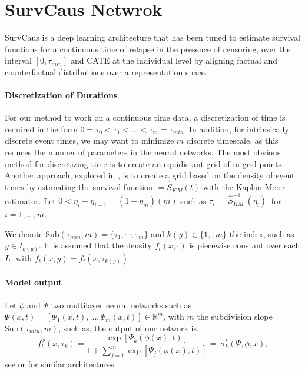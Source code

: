 \documentclass[12pt]{article}
\theoremstyle{plain}
\theoremstyle{definition}
\theoremstyle{remark}
\begin{document}
\section{SurvCaus Netwrok}
\label{survcaus}
SurvCaus is a deep learning architecture that has been tuned to estimate survival functions for a continuous time of relapse in the presence of censoring, over the interval $[0, \tau_{min}]$ and CATE at the individual level by aligning factual and counterfactual distributions over a representation space.

\paragraph{Discretization of Durations} 
For our method to work on a continuous time data, a discretization of time is required in the form $0=\tau _{0} < \tau _{1} < \dotsc < \tau _{m} =\tau_{min}$. In addition, for intrinsically discrete event times, we may want to minimize $m$ discrete timescale, as this reduces the number of parameters in the neural networks. The most obvious method for discretizing time is to create an equidistant grid of m grid points. Another approach, explored in \cite{kvamme2019continuous}, is to create a grid based on the density of event times by estimating the survival function $ =\hat{S}_{KM}(t)$ with the Kaplan-Meier estimator. Let $ 0< \eta _{i} -\eta _{i+1} = (1-\eta _{m} )(m)$ such as $ \tau _{i} \ =\hat{S}^{-1}_{KM} \ ( \eta _{i}) \ $  for $ i=1,\dotsc ,m$.


We denote $\text{Sub}( \tau_{min} ,m) =\{\tau _{1} ,\cdots ,\tau _{m}\}$ and $ k(y) \in \{1, ,m\}$ the index, such as $ y\in I_{k(y)}$. It is assumed that the density $f_t(x,\cdot)$ is piecewise constant over each $ I_{i}$, with $f_t(x,y)=f_t(x,\tau_{k(y)}) $.
					

\paragraph{Model output}
Let $\phi$ and $\Psi$ two multilayer neural networks such as $\Psi ( x,t) =[\Psi_{1}( x,t) ,\dotsc ,\Psi_{m}( x,t)] \in \mathbb{R}^{m}$, with $m$ the subdivision slope $\text{Sub}( \tau_{min} ,m)$,  such as, the output of our network is,
\begin{equation*}
    f^{\phi }_{t}( x ,\tau _{k}) =\frac{\exp[ \Psi_{k}( \phi ( x) ,t)]}{1+\sum ^{m}_{j=1}\exp[ \Psi_{j}( \phi ( x) ,t)]} =\ \sigma ^{t}_{k}( \Psi ,\phi ,x),
\end{equation*}
see \cite{lee2018deephit} or \cite{kvamme2019continuous} for similar architectures.
\end{document}
